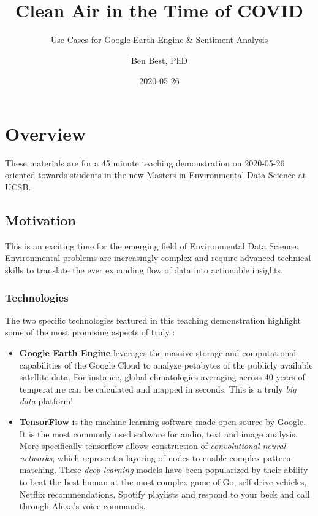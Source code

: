 \documentclass[]{book}
\title{Clean Air in the Time of COVID}
\subtitle{Use Cases for Google Earth Engine \& Sentiment Analysis}
\author{Ben Best, PhD}
\date{2020-05-26}
\begin{document}
\maketitle

{
\setcounter{tocdepth}{1}
\tableofcontents
}
\hypertarget{overview}{%
\chapter*{Overview}\label{overview}}

These materials are for a 45 minute teaching demonstration on 2020-05-26 oriented towards students in the new Masters in Environmental Data Science at UCSB.

\hypertarget{motivation}{%
\section*{Motivation}\label{motivation}}

This is an exciting time for the emerging field of Environmental Data Science. Environmental problems are increasingly complex and require advanced technical skills to translate the ever expanding flow of data into actionable insights.

\hypertarget{technologies}{%
\subsection*{Technologies}\label{technologies}}

The two specific technologies featured in this teaching demonstration highlight some of the most promising aspects of truly :

\begin{itemize}
\item
  \textbf{Google Earth Engine} leverages the massive storage and computational capabilities of the Google Cloud to analyze petabytes of the publicly available satellite data. For instance, global climatologies averaging across 40 years of temperature can be calculated and mapped in seconds. This is a truly \emph{big data} platform!
\item
  \textbf{TensorFlow} is the machine learning software made open-source by Google. It is the most commonly used software for audio, text and image analysis. More specifically tensorflow allows construction of \emph{convolutional neural networks}, which represent a layering of nodes to enable complex pattern matching. These \emph{deep learning} models have been popularized by their ability to beat the best human at the most complex game of Go, self-drive vehicles, Netflix recommendations, Spotify playlists and respond to your beck and call through Alexa's voice commands.
\end{itemize}
\end{document}
